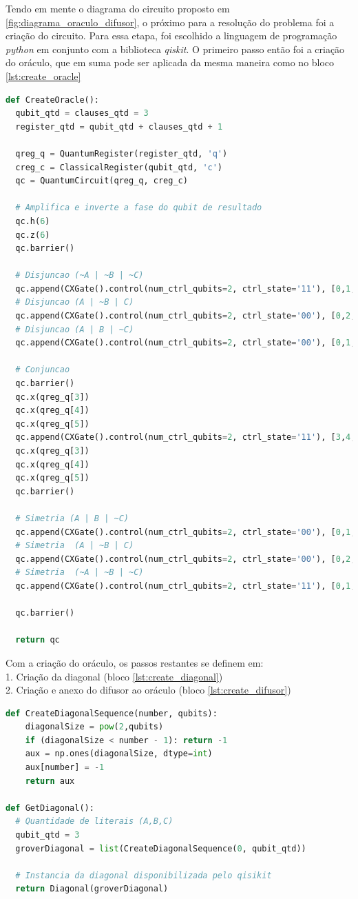 \documentclass[12pt]{article}
\begin{document}
Tendo em mente o diagrama do circuito proposto em \ref{fig:diagrama_oraculo_difusor}, o próximo para a resolução do problema foi a criação do circuito. Para essa etapa, foi escolhido a linguagem de programação \textit{python} em conjunto com a biblioteca \textit{qiskit}.
O primeiro passo então foi a criação do oráculo, que em suma pode ser aplicada da mesma maneira como no bloco \ref{lst:create_oracle}
\begin{lstlisting}[language=Python, caption={Criação do oráculo}, frame=single, label={lst:create_oracle}]
def CreateOracle():
  qubit_qtd = clauses_qtd = 3
  register_qtd = qubit_qtd + clauses_qtd + 1

  qreg_q = QuantumRegister(register_qtd, 'q')
  creg_c = ClassicalRegister(qubit_qtd, 'c')
  qc = QuantumCircuit(qreg_q, creg_c)

  # Amplifica e inverte a fase do qubit de resultado
  qc.h(6)
  qc.z(6)
  qc.barrier()
  
  # Disjuncao (~A | ~B | ~C)
  qc.append(CXGate().control(num_ctrl_qubits=2, ctrl_state='11'), [0,1,2,3])
  # Disjuncao (A | ~B | C)
  qc.append(CXGate().control(num_ctrl_qubits=2, ctrl_state='00'), [0,2,1,4])
  # Disjuncao (A | B | ~C)
  qc.append(CXGate().control(num_ctrl_qubits=2, ctrl_state='00'), [0,1,2,5])

  # Conjuncao
  qc.barrier()
  qc.x(qreg_q[3])
  qc.x(qreg_q[4])
  qc.x(qreg_q[5])
  qc.append(CXGate().control(num_ctrl_qubits=2, ctrl_state='11'), [3,4,5,6])
  qc.x(qreg_q[3])
  qc.x(qreg_q[4])
  qc.x(qreg_q[5])
  qc.barrier()

  # Simetria (A | B | ~C)
  qc.append(CXGate().control(num_ctrl_qubits=2, ctrl_state='00'), [0,1,2,5])
  # Simetria  (A | ~B | C)
  qc.append(CXGate().control(num_ctrl_qubits=2, ctrl_state='00'), [0,2,1,4])
  # Simetria  (~A | ~B | ~C)
  qc.append(CXGate().control(num_ctrl_qubits=2, ctrl_state='11'), [0,1,2,3])

  qc.barrier()

  return qc
\end{lstlisting}
Com a criação do oráculo, os passos restantes se definem em: \\
1. Criação da diagonal (bloco \ref{lst:create_diagonal})\\
2. Criação e anexo do difusor ao oráculo (bloco \ref{lst:create_difusor})\\

\begin{lstlisting}[language=Python, caption={Criação da diagonal}, frame=single, label={lst:create_diagonal}]
def CreateDiagonalSequence(number, qubits):
    diagonalSize = pow(2,qubits)
    if (diagonalSize < number - 1): return -1
    aux = np.ones(diagonalSize, dtype=int)
    aux[number] = -1
    return aux

def GetDiagonal():
  # Quantidade de literais (A,B,C)
  qubit_qtd = 3
  groverDiagonal = list(CreateDiagonalSequence(0, qubit_qtd))
  
  # Instancia da diagonal disponibilizada pelo qisikit
  return Diagonal(groverDiagonal) 
\end{lstlisting}
\end{document}
